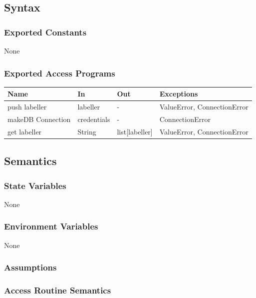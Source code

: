\documentclass[12pt, titlepage]{article}
\begin{document}
  
  \subsection{Syntax}


  
  \subsubsection{Exported Constants}
  None
  \subsubsection{Exported Access Programs}
  
  \begin{center}
  \begin{tabular}{p{2cm} p{4cm} p{4cm} p{2cm}}
  \hline
  \textbf{Name} & \textbf{In} & \textbf{Out} & \textbf{Exceptions} \\
  \hline
  push labeller & labeller & - & ValueError, ConnectionError \\
  \hline
  makeDB Connection & credentials & - & ConnectionError \\
  \hline
  get labeller & String & list[labeller] & ValueError, ConnectionError \\
  \hline
  \end{tabular}
  \end{center}
  
  \subsection{Semantics}
  
  \subsubsection{State Variables}
  
  None
  
  \subsubsection{Environment Variables}
  
  None
  
  \subsubsection{Assumptions}
  
  
  \subsubsection{Access Routine Semantics}
  
\end{document}

